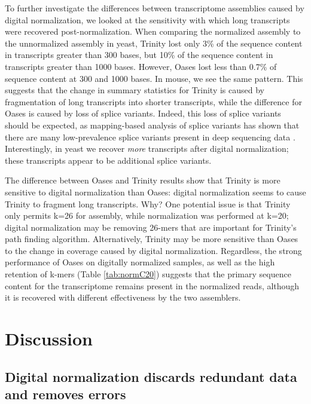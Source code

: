 \documentclass[10pt]{article}
\begin{document}
To further investigate the differences between transcriptome
assemblies caused by digital normalization, we looked at the
sensitivity with which long transcripts were recovered
post-normalization.  When comparing the normalized assembly to the
unnormalized assembly in yeast, Trinity lost only 3\% of the sequence
content in transcripts greater than 300 bases, but 10\% of the
sequence content in transcripts greater than 1000 bases.  However,
Oases lost less than 0.7\% of sequence content at 300 and
1000 bases.  In mouse, we see the same pattern.
This suggests that the change in summary statistics for
Trinity is caused by fragmentation of long transcripts into shorter
transcripts, while the difference for Oases is caused by loss of
splice variants.  Indeed, this
loss of splice variants should be expected, as mapping-based analysis
of splice variants has shown that there are many low-prevalence splice
variants present in deep sequencing data \cite{pubmed21151575}.
Interestingly, in yeast we recover {\em more} transcripts after
digital normalization; these transcripts appear to be additional splice
variants.


The difference between Oases and Trinity results show that Trinity is
more sensitive to digital normalization than Oases: digital
normalization seems to cause Trinity to fragment long transcripts.
Why?  One potential issue is that Trinity only permits k=26 for
assembly, while normalization was performed at k=20; digital
normalization may be removing 26-mers that are important for Trinity's
path finding algorithm.  Alternatively, Trinity may be more sensitive
than Oases to the change in coverage caused by digital normalization.
Regardless, the strong performance of Oases on digitally normalized
samples, as well as the high retention of k-mers (Table \ref{tab:normC20})
suggests that the primary sequence content for the transcriptome remains
present in the normalized reads, although it is recovered with different
effectiveness by the two assemblers.

\section*{Discussion}

\subsection*{Digital normalization discards redundant data and removes errors}
\end{document}

